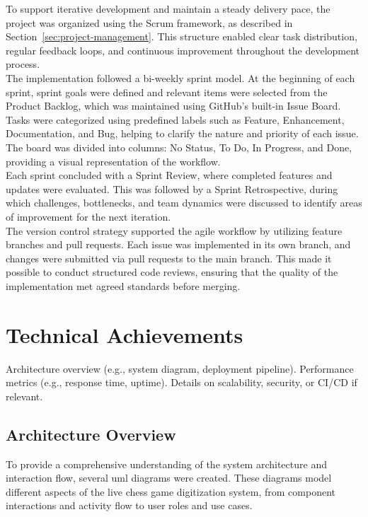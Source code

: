 To support iterative development and maintain a steady delivery pace, the project was organized using the Scrum framework, as described in Section~\ref{sec:project-management}. This structure enabled clear task distribution, regular feedback loops, and continuous improvement throughout the development process. \\

The implementation followed a bi-weekly sprint model. At the beginning of each sprint, sprint goals were defined and relevant items were selected from the Product Backlog, which was maintained using GitHub’s built-in Issue Board. Tasks were categorized using predefined labels such as Feature, Enhancement, Documentation, and Bug, helping to clarify the nature and priority of each issue. The board was divided into columns: No Status, To Do, In Progress, and Done, providing a visual representation of the workflow. \\

Each sprint concluded with a Sprint Review, where completed features and updates were evaluated. This was followed by a Sprint Retrospective, during which challenges, bottlenecks, and team dynamics were discussed to identify areas of improvement for the next iteration. \\

The version control strategy supported the agile workflow by utilizing feature branches and pull requests. Each issue was implemented in its own branch, and changes were submitted via pull requests to the main branch. This made it possible to conduct structured code reviews, ensuring that the quality of the implementation met agreed standards before merging. \\

\section{Technical Achievements}
Architecture overview (e.g., system diagram, deployment pipeline). Performance metrics (e.g., response time, uptime). Details on scalability, security, or CI/CD if relevant.

\subsection{Architecture Overview}
\label{subsec:diagrams}

To provide a comprehensive understanding of the system architecture and interaction flow, several \gls{uml} diagrams were created. These diagrams model different aspects of the live chess game digitization system, from component interactions and activity flow to user roles and use cases.

